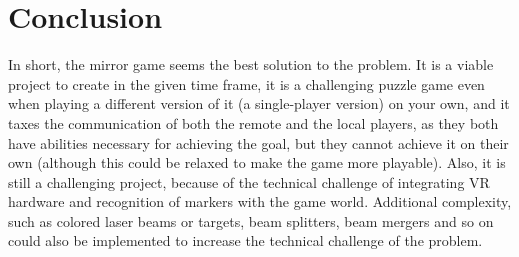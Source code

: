 \chapter{Conclusion} \label{cha:conclusion}
	In short, the mirror game seems the best solution to the problem. It is a
	viable project to create in the given time frame, it is a challenging puzzle
	game even when playing a different version of it (a single-player version) on
	your own, and it taxes the communication of both the remote and the local
	players, as they both have abilities necessary for achieving the goal, but
	they cannot achieve it on their own (although this could be relaxed to make
	the game more playable). Also, it is still a challenging project, because of
	the technical challenge of integrating VR hardware and recognition of markers
	with the game world. Additional complexity, such as colored laser beams or
	targets, beam splitters, beam mergers and so on could also be implemented to
	increase the technical challenge of the problem.

